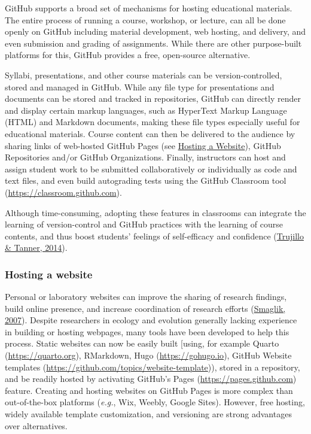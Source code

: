 GitHub supports a broad set of mechanisms for hosting educational materials.
The entire process of running a course, workshop, or lecture, can all be done openly on GitHub including material development, web hosting, and delivery, and even submission and grading of assignments.
While there are other purpose-built platforms for this, GitHub provides a free, open-source alternative.

Syllabi, presentations, and other course materials can be version-controlled, stored and managed in GitHub.
While any file type for presentations and documents can be stored and tracked in repositories, GitHub can directly render and display certain markup languages, such as HyperText Markup Language (HTML) and Markdown documents, making these file types especially useful for educational materials.
Course content can then be delivered to the audience by sharing links of web-hosted GitHub Pages (see \protect\hyperlink{hosting-a-website}{Hosting a Website}), GitHub Repositories and/or GitHub Organizations.
Finally, instructors can host and assign student work to be submitted collaboratively or individually as code and text files, and even build autograding tests using the GitHub Classroom tool (\url{https://classroom.github.com}).

Although time-consuming, adopting these features in classrooms can integrate the learning of version-control and GitHub practices with the learning of course contents, and thus boost students' feelings of self-efficacy and confidence (\protect\hyperlink{ref-dqrFjoSb}{Trujillo \& Tanner, 2014}).

\hypertarget{hosting-a-website}{%
\subsubsection{Hosting a website}\label{hosting-a-website}}

Personal or laboratory websites can improve the sharing of research findings, build online presence, and increase coordination of research efforts (\protect\hyperlink{ref-HiIPSSHV}{Smaglik, 2007}).
Despite researchers in ecology and evolution generally lacking experience in building or hosting webpages, many tools have been developed to help this process.
Static websites can now be easily built {[}using, for example Quarto (\url{https://quarto.org}), RMarkdown, Hugo (\url{https://gohugo.io}), GitHub Website templates (\url{https://github.com/topics/website-template})), stored in a repository, and be readily hosted by activating GitHub's Pages (\url{https://pages.github.com}) feature.
Creating and hosting websites on GitHub Pages is more complex than out-of-the-box platforms (\emph{e.g.}, Wix, Weebly, Google Sites).
However, free hosting, widely available template customization, and versioning are strong advantages over alternatives.

